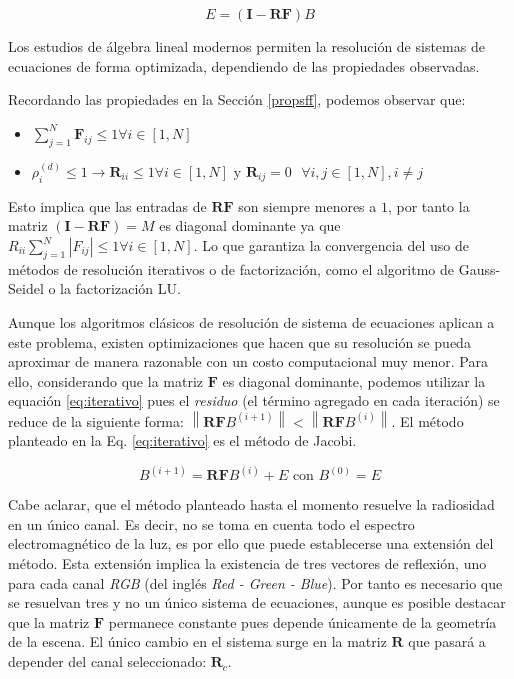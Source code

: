 \begin{equation}
	E = (\mathbf{I} - \mathbf{RF})B
\end{equation}

Los estudios de álgebra lineal modernos permiten la resolución de sistemas de ecuaciones de forma optimizada, dependiendo de las propiedades observadas.

Recordando las propiedades en la Sección \ref{propsff}, podemos observar que:

\begin{itemize}
	\item $\sum_{j=1}^{N} \mathbf{F}_{ij} \leq 1 \forall{i \in [1,N]}$
	\item $\rho^{(d)}_{i} \leq 1 \rightarrow \mathbf{R}_{ii} \leq 1 \forall{i \in [1,N]}\text{ y }\mathbf{R}_{ij} = 0 \text{  }\forall{i,j \in [1,N], i \neq j}$
\end{itemize}

Esto implica que las entradas de $\mathbf{RF}$ s\texttt{}on siempre menores a $1$, por tanto la matriz $(\mathbf{I} - \mathbf{RF}) = M$ es diagonal dominante ya que $R_{ii}\sum_{j=1}^{N}|F_{ij}| \le 1 \forall i \in [1, N]$. Lo que garantiza la convergencia del uso de métodos de resolución iterativos o de factorización, como el algoritmo de Gauss-Seidel o la factorización LU.

Aunque los algoritmos clásicos de resolución de sistema de ecuaciones aplican a este problema, existen optimizaciones que hacen que su resolución se pueda aproximar de manera razonable con un costo computacional muy menor. Para ello, considerando que la matriz $\mathbf{F}$ es diagonal dominante, podemos utilizar la equación \ref{eq:iterativo} pues el \textit{residuo} (el término agregado en cada iteración) se reduce de la siguiente forma: $\left\|\mathbf{RF}B^{(i+1)}\right\| < \left\|\mathbf{RF}B^{(i)}\right\|$. El método planteado en la Eq. \eqref{eq:iterativo} es el método de Jacobi.

\begin{equation}
	B^{(i+1)}  = \mathbf{RF}B^{(i)}  + E \text{ con }  B^{(0)} = E
	\label{eq:iterativo}
\end{equation}

Cabe aclarar, que el método planteado hasta el momento resuelve la radiosidad en un único canal. Es decir, no se toma en cuenta todo el espectro electromagnético de la luz, es por ello que puede establecerse una extensión del método. Esta extensión implica la existencia de tres vectores de reflexión, uno para cada canal \textit{RGB} (del inglés \textit{Red - Green - Blue}). Por tanto es necesario que se resuelvan tres y no un único sistema de ecuaciones, aunque es posible destacar que la matriz $\mathbf{F}$ permanece constante pues depende únicamente de la geometría de la escena. El único cambio en el sistema surge en la matriz $\mathbf{R}$ que pasará a depender del canal seleccionado: $\mathbf{R}_{c}$.

